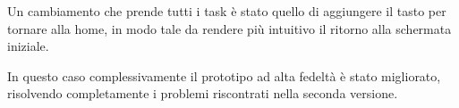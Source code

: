 \documentclass{article}
\begin{document}
Un cambiamento che prende tutti i task è stato quello di aggiungere il tasto per tornare alla home, in modo tale da rendere più intuitivo il ritorno alla schermata iniziale.

In questo caso complessivamente il prototipo ad alta fedeltà è stato migliorato, risolvendo completamente i problemi riscontrati nella seconda versione.
\end{document}
